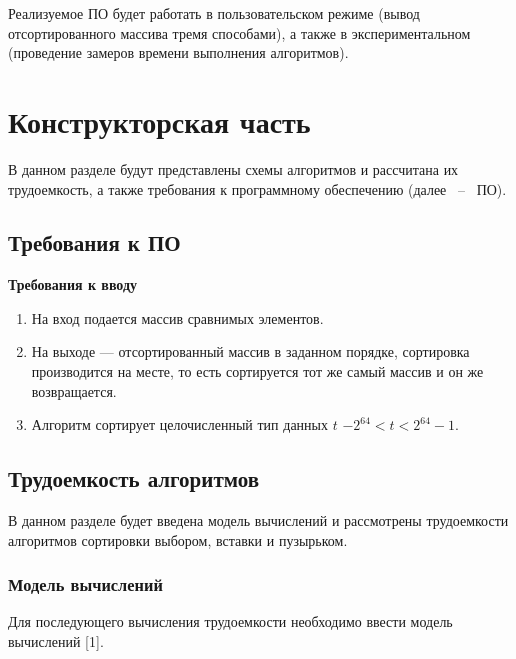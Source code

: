 \documentclass[14pt,russian]{scrartcl}
\begin{document}
Реализуемое ПО будет работать в пользовательском режиме (вывод отсортированного массива тремя способами), а также в экспериментальном (проведение замеров времени выполнения алгоритмов).

\section{Конструкторская часть}

В данном разделе будут представлены схемы алгоритмов и рассчитана их трудоемкость, а также требования к программному обеспечению (далее ~--~ ПО).

\subsection{Требования к ПО}

\textbf{Требования к вводу}
		
\begin{enumerate}
	\item На вход подается массив сравнимых элементов.
	\item На выходе --- отсортированный массив в заданном порядке, сортировка производится на месте, то есть сортируется тот же самый массив и он же возвращается.
	\item Алгоритм сортирует целочисленный тип данных $t$ $-2^{64} < t < 2^{64} - 1$.
\end{enumerate}

\subsection{Трудоемкость алгоритмов}

В данном разделе будет введена модель вычислений и рассмотрены трудоемкости алгоритмов сортировки выбором, вставки и пузырьком.

\subsubsection{Модель вычислений}

Для последующего вычисления трудоемкости необходимо ввести модель вычислений [1].
\end{document}
